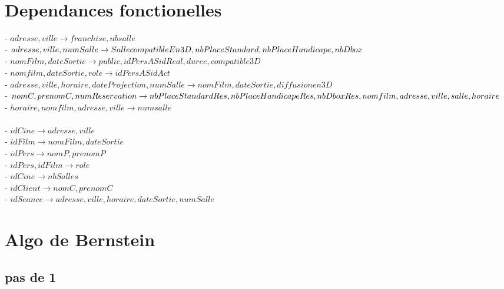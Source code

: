 \documentclass[a4paper,sffamily,12pt]{article}
\begin{document}
\vspace{1cm}


\section{Dependances fonctionelles}

\noindent- $adresse, ville \rightarrow franchise, nbsalle$ \\
- $adresse, ville, numSalle \rightarrow SallecompatibleEn3D, nbPlaceStandard,\\
 nbPlaceHandicape,nbDbox$ \\
- $nomFilm, dateSortie \rightarrow public, idPers AS idReal, duree, compatible3D$ \\
- $nomfilm, dateSortie, role \rightarrow idPers AS idAct$ \\
- $adresse, ville, horaire, dateProjection, numSalle \rightarrow nomFilm, dateSortie, diffusionen3D $ \\
- $nomC, prenomC, numReservation \rightarrow nbPlaceStandardRes, nbPlaceHandicapeRes,\\
 nbDboxRes, nomfilm, adresse, ville, salle, horaire$ \\
- $horaire, nomfilm, adresse, ville \rightarrow  numsalle$ \\ 
\\
- $idCine \rightarrow adresse, ville$ \\
- $idFilm \rightarrow nomFilm, dateSortie$ \\
- $idPers \rightarrow nomP, prenomP$ \\
- $idPers, idFilm \rightarrow role$ \\
- $idCine \rightarrow nbSalles$ \\
- $idClient \rightarrow nomC, prenomC$ \\
- $idSeance \rightarrow adresse, ville, horaire, dateSortie, numSalle$ \\

\vspace{1cm}

\section{Algo de Bernstein}

\subsection{pas de 1}

\vspace{1cm}
\end{document}
